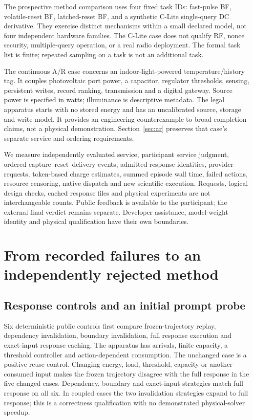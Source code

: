 The prospective method comparison uses four fixed task IDs: fast-pulse BF,
volatile-reset BF, latched-reset BF, and a synthetic C-Lite single-query DC
derivative. They exercise distinct mechanisms within a small declared model,
not four independent hardware families. The C-Lite case does not qualify RF,
nonce security, multiple-query operation, or a real radio deployment. The formal
task list is finite; repeated sampling on a task is not an additional task.

The continuous A/R case concerns an indoor-light-powered temperature/history tag.
It couples photovoltaic port power, a capacitor, regulator thresholds, sensing,
persistent writes, record ranking, transmission and a digital gateway. Source
power is specified in watts; illuminance is descriptive metadata. The legal
apparatus starts with no stored energy and has an uncalibrated source, storage
and write model. It provides an engineering counterexample to broad completion
claims, not a physical demonstration. Section~\ref{sec:ar} preserves that case's
separate service and ordering requirements.

We measure independently evaluated service, participant service judgment,
ordered capture--reset--delivery events, admitted response identities, provider
requests, token-based charge estimates, summed episode wall time, failed actions,
resource censoring, native dispatch and new scientific execution. Requests,
logical design checks, cached response files and physical experiments are not
interchangeable counts. Public feedback is available to the participant; the
external final verdict remains separate. Developer assistance, model-weight
identity and physical qualification have their own boundaries.

\section{From recorded failures to an independently rejected method}
\subsection{Response controls and an initial prompt probe}
Six deterministic public controls first compare frozen-trajectory replay,
dependency invalidation, boundary invalidation, full response execution and
exact-input response caching. The apparatus has arrivals, finite capacity, a
threshold controller and action-dependent consumption. The unchanged case is
a positive reuse control. Changing energy, load, threshold, capacity or another
consumed input makes the frozen trajectory disagree with the full response in
the five changed cases. Dependency, boundary and exact-input strategies match
full response on all six. In coupled cases the two invalidation strategies
expand to full response; this is a correctness qualification with no demonstrated
physical-solver speedup.

